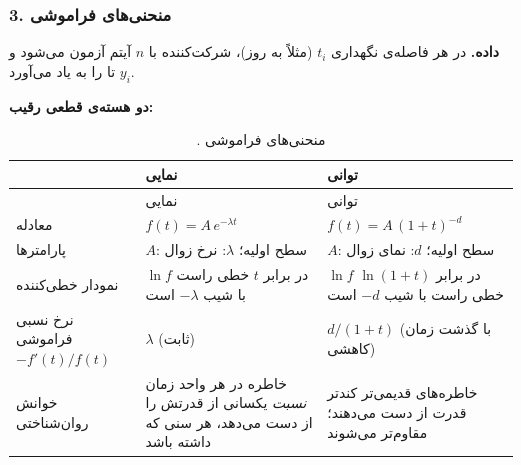 \subsubsection{3. منحنی‌های فراموشی}

\textbf{داده.} در هر فاصله‌ی نگهداری \(t_i\) (مثلاً به روز)، شرکت‌کننده با
\(n\) آیتم آزمون می‌شود و \(y_i\) تا را به یاد می‌آورد.

\textbf{دو هسته‌ی قطعی رقیب:}

\begin{longtable}[]{@{}
  >{\raggedright\arraybackslash}p{}
  >{\raggedright\arraybackslash}p{}
  >{\raggedright\arraybackslash}p{}@{}}
\caption{. منحنی‌های فراموشی}\tabularnewline
\toprule\noalign{}
\begin{minipage}[b]{\linewidth}\raggedright
\end{minipage} & \begin{minipage}[b]{\linewidth}\raggedright
نمایی
\end{minipage} & \begin{minipage}[b]{\linewidth}\raggedright
توانی
\end{minipage} \\
\midrule\noalign{}
\endfirsthead
\toprule\noalign{}
\begin{minipage}[b]{\linewidth}\raggedright
\end{minipage} & \begin{minipage}[b]{\linewidth}\raggedright
نمایی
\end{minipage} & \begin{minipage}[b]{\linewidth}\raggedright
توانی
\end{minipage} \\
\midrule\noalign{}
\endhead
\bottomrule\noalign{}
\endlastfoot
معادله & \(f(t) = A\,e^{-\lambda t}\) & \(f(t) = A\,(1 + t)^{-d}\) \\
پارامترها & \(A\): سطح اولیه؛ \(\lambda\): نرخ زوال & \(A\): سطح اولیه؛
\(d\): نمای زوال \\
نمودار خطی‌کننده & \(\ln f\) در برابر \(t\) خطی راست با شیب \(-\lambda\)
است & \(\ln f\) در برابر \(\ln(1+t)\) خطی راست با شیب \(-d\) است \\
نرخ نسبی فراموشی \(-f'(t)/f(t)\) & \(\lambda\) (ثابت) & \(d/(1+t)\) (با
گذشت زمان کاهشی) \\
خوانش روان‌شناختی & خاطره در هر واحد زمان \emph{نسبت} یکسانی از قدرتش را
از دست می‌دهد، هر سنی که داشته باشد & خاطره‌های قدیمی‌تر کندتر قدرت از دست
می‌دهند؛ مقاوم‌تر می‌شوند \\
\end{longtable}

